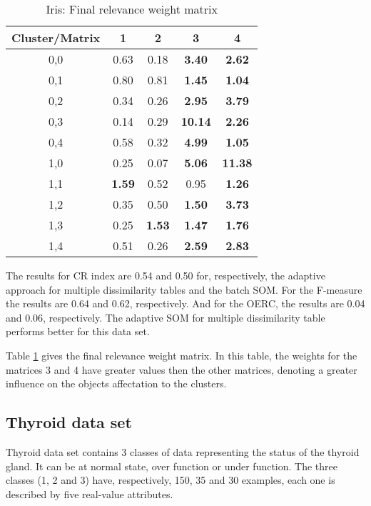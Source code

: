 \documentclass[10pt, conference, compsocconf]{IEEEtran}
\begin{document}
\begin{table}[!h]
\renewcommand{\arraystretch}{1.2}
\begin{center}
\caption{Iris: Final relevance weight matrix}
\begin{tabular}{|c|c|c|c|c|}
\hline
Cluster/Matrix & 1 & 2 & 3 & 4 \\ \hline
0,0 & 0.63 & 0.18 & \textbf{3.40} & \textbf{2.62} \\ \hline
0,1 & 0.80 & 0.81 & \textbf{1.45} & \textbf{1.04} \\ \hline
0,2 & 0.34 & 0.26 & \textbf{2.95} & \textbf{3.79} \\ \hline
0,3 & 0.14 & 0.29 & \textbf{10.14} & \textbf{2.26} \\ \hline
0,4 & 0.58 & 0.32 & \textbf{4.99} & \textbf{1.05} \\ \hline
1,0 & 0.25 & 0.07 & \textbf{5.06} & \textbf{11.38} \\ \hline
1,1 & \textbf{1.59} & 0.52 & 0.95 & \textbf{1.26} \\ \hline
1,2 & 0.35 & 0.50 & \textbf{1.50} & \textbf{3.73} \\ \hline
1,3 & 0.25 & \textbf{1.53} & \textbf{1.47} & \textbf{1.76} \\ \hline
1,4 & 0.51 & 0.26 & \textbf{2.59} & \textbf{2.83} \\ \hline

\end{tabular}
\label{iris_pesos}
\end{center}
\end{table}

The results for CR index are 0.54 and 0.50 for, respectively, the adaptive approach for multiple dissimilarity tables and the batch SOM. For the F-measure the results are 0.64 and 0.62, respectively. And for the OERC, the results are 0.04 and 0.06, respectively. The adaptive SOM for multiple dissimilarity table performs better for this data set.

Table \ref{iris_pesos} gives the final relevance weight matrix. In this table, the weights for the matrices 3 and 4 have greater values then the other matrices, denoting a greater influence on the objects affectation to the clusters.

\subsection{Thyroid data set}

Thyroid data set contains 3 classes of data representing the status of the thyroid gland. It can be at normal state, over function or under function. The three classes (1, 2 and 3) have, respectively, 150, 35 and 30 examples, each one is described by five real-value attributes.
\end{document}
